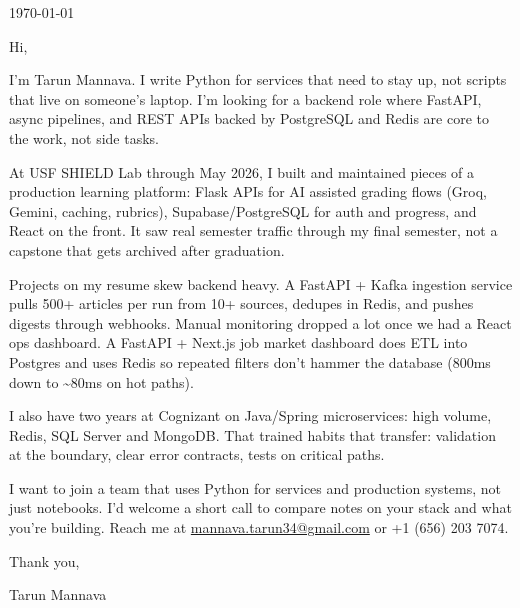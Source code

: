 




\coverLetterHeading

\vspace{14pt}
\noindent\today

\vspace{14pt}
\noindent Hi,

I'm Tarun Mannava. I write Python for services that need to stay up, not scripts that live on someone's laptop. I'm looking for a backend role where FastAPI, async pipelines, and REST APIs backed by PostgreSQL and Redis are core to the work, not side tasks.

At USF SHIELD Lab through May 2026, I built and maintained pieces of a production learning platform: Flask APIs for AI assisted grading flows (Groq, Gemini, caching, rubrics), Supabase/PostgreSQL for auth and progress, and React on the front. It saw real semester traffic through my final semester, not a capstone that gets archived after graduation.

Projects on my resume skew backend heavy. A FastAPI + Kafka ingestion service pulls 500+ articles per run from 10+ sources, dedupes in Redis, and pushes digests through webhooks. Manual monitoring dropped a lot once we had a React ops dashboard. A FastAPI + Next.js job market dashboard does ETL into Postgres and uses Redis so repeated filters don't hammer the database (800ms down to \textasciitilde80ms on hot paths).

I also have two years at Cognizant on Java/Spring microservices: high volume, Redis, SQL Server and MongoDB. That trained habits that transfer: validation at the boundary, clear error contracts, tests on critical paths.

I want to join a team that uses Python for services and production systems, not just notebooks. I'd welcome a short call to compare notes on your stack and what you're building. Reach me at \href{mailto:mannava.tarun34@gmail.com}{mannava.tarun34@gmail.com} or +1 (656) 203 7074.

Thank you,

\noindent Tarun Mannava


